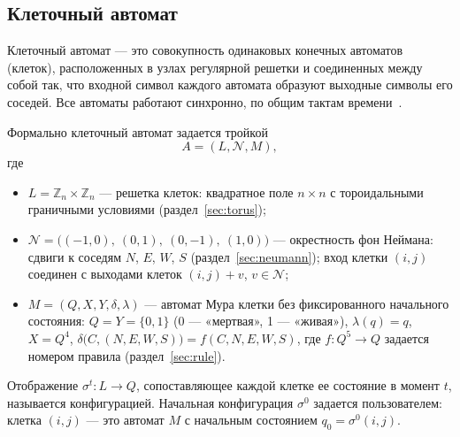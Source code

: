 \documentclass[a4paper,14pt]{extarticle}
\begin{document}


\subsection{Клеточный автомат}
\label{sec:ca}

Клеточный автомат --- это совокупность одинаковых конечных автоматов (клеток), расположенных в узлах регулярной решетки и соединенных между собой так, что входной символ каждого автомата образуют выходные символы его соседей. Все автоматы работают синхронно, по общим тактам времени~\cite{tema, toffoli, neumann}.

Формально клеточный автомат задается тройкой
\[
	A = (L, \mathcal{N}, M),
\]
где
\begin{itemize}
	\item $L = \mathbb{Z}_n \times \mathbb{Z}_n$ --- решетка клеток: квадратное поле $n \times n$ с тороидальными граничными условиями (раздел~\ref{sec:torus});
	\item $\mathcal{N} = \bigl((-1, 0),\ (0, 1),\ (0, -1),\ (1, 0)\bigr)$ --- окрестность фон Неймана: сдвиги к соседям $N$, $E$, $W$, $S$ (раздел~\ref{sec:neumann}); вход клетки $(i, j)$ соединен с выходами клеток $(i, j) + v$, $v \in \mathcal{N}$;
	\item $M = (Q, X, Y, \delta, \lambda)$ --- автомат Мура клетки без фиксированного начального состояния: $Q = Y = \{0, 1\}$ (0 --- «мертвая», 1 --- «живая»), $\lambda(q) = q$, $X = Q^4$, $\delta\bigl(C, (N, E, W, S)\bigr) = f(C, N, E, W, S)$, где $f: Q^5 \to Q$ задается номером правила (раздел~\ref{sec:rule}).
\end{itemize}

Отображение $\sigma^t: L \to Q$, сопоставляющее каждой клетке ее состояние в момент $t$, называется конфигурацией. Начальная конфигурация $\sigma^0$ задается пользователем: клетка $(i, j)$ --- это автомат $M$ с начальным состоянием $q_0 = \sigma^0(i, j)$.
\end{document}
